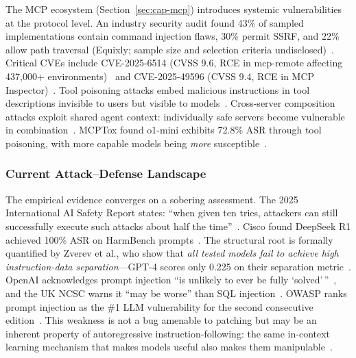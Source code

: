 The MCP ecosystem (Section~\ref{sec:cap-mcp}) introduces systemic vulnerabilities at the protocol level. An industry security audit found 43\% of sampled implementations contain command injection flaws, 30\% permit SSRF, and 22\% allow path traversal (Equixly; sample size and selection criteria undisclosed)~\cite{equixly2025mcp}. Critical CVEs include CVE-2025-6514 (CVSS 9.6, RCE in mcp-remote affecting 437,000+ environments)~\cite{jfrog2025mcpremote} and CVE-2025-49596 (CVSS 9.4, RCE in MCP Inspector)~\cite{oligo2025inspector}. Tool poisoning attacks embed malicious instructions in tool descriptions invisible to users but visible to models~\cite{invariant2025toolpoisoning}. Cross-server composition attacks exploit shared agent context: individually safe servers become vulnerable in combination~\cite{invariant2025whatsapp,croce2025trivial}. MCPTox found o1-mini exhibits 72.8\% ASR through tool poisoning, with more capable models being \emph{more} susceptible~\cite{wang2025mcptox}.


\subsubsection{Current Attack--Defense Landscape}
\label{sec:threat-landscape}

The empirical evidence converges on a sobering assessment. The 2025 International AI Safety Report states: ``when given ten tries, attackers can still successfully execute such attacks about half the time''~\cite{aisafetyreport2025}. Cisco found DeepSeek R1 achieved 100\% ASR on HarmBench prompts~\cite{cisco2025deepseek}. The structural root is formally quantified by Zverev et al., who show that \emph{all tested models fail to achieve high instruction-data separation}---GPT-4 scores only 0.225 on their separation metric~\cite{zverev2025separation}. OpenAI acknowledges prompt injection ``is unlikely to ever be fully `solved'\,''~\cite{openai2025atlas}, and the UK NCSC warns it ``may be worse'' than SQL injection~\cite{ncsc2025promptinjection}. OWASP ranks prompt injection as the \#1 LLM vulnerability for the second consecutive edition~\cite{owasp2025}. This weakness is not a bug amenable to patching but may be an inherent property of autoregressive instruction-following: the same in-context learning mechanism that makes models useful also makes them manipulable~\cite{zverev2025separation}.

